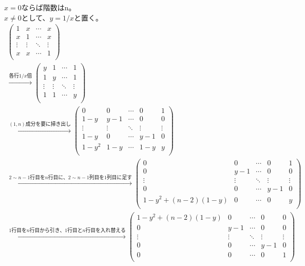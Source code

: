 \documentclass{jsarticle}
\begin{document}
\section{} %
$x = 0$ならば階数はn。\\
$x \neq 0$として、$y = 1 / x$と置く。\\
\begin{eqnarray*}
	\left(
		\begin{array}{cccc}
			 1 & x & \cdots & x\\
			 x & 1 & \cdots & x\\
			 \vdots & \vdots & \ddots & \vdots\\
			 x & x & \cdots & 1\\
		\end{array}
	\right)\\
	\xrightarrow{各行1/x倍}
	\left(
		\begin{array}{cccc}
			 y & 1 & \cdots & 1\\
			 1 & y & \cdots & 1\\
			 \vdots & \vdots & \ddots & \vdots\\
			 1 & 1 & \cdots & y\\
		\end{array}
	\right)\\
	\xrightarrow{(1, n)成分を要に掃き出し}
	\left(
		\begin{array}{ccccc}
			 0 & 0 & \cdots & 0 & 1\\
			 1 - y & y - 1 & \cdots & 0 & 0\\
			 \vdots & \vdots & \ddots & \vdots & \vdots\\
			 1 - y & 0 & \cdots & y - 1 & 0\\
			 1 - y^2 & 1 - y & \cdots & 1 - y & y\\
		\end{array}
	\right)\\
	\xrightarrow{2{\sim}n-1行目をn行目に、2{\sim}n-1列目を1列目に足す}
	\left(
		\begin{array}{ccccc}
			 0 & 0 & \cdots & 0 & 1\\
			 0 & y - 1 & \cdots & 0 & 0\\
			 \vdots & \vdots & \ddots & \vdots & \vdots\\
			 0 & 0 & \cdots & y - 1 & 0\\
			 1 - y^2 + (n - 2)(1 - y) & 0 & \cdots & 0 & y\\
		\end{array}
	\right)\\
	\xrightarrow{1行目をn行目から引き、1行目とn行目を入れ替える}
	\left(
		\begin{array}{ccccc}
			1 - y^2 + (n - 2)(1 - y) & 0 & \cdots & 0 & 0\\
			 0 & y - 1 & \cdots & 0 & 0\\
			 \vdots & \vdots & \ddots & \vdots & \vdots\\
			 0 & 0 & \cdots & y - 1 & 0\\
			 0 & 0 & \cdots & 0 & 1\\
		\end{array}
	\right)\\
\end{eqnarray*}
\end{document}
